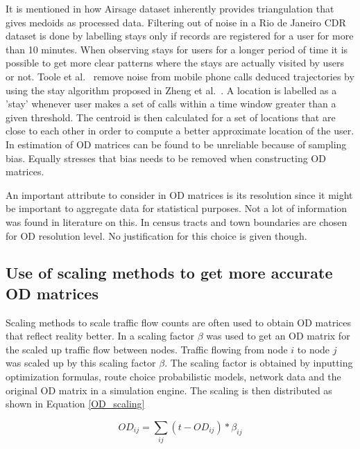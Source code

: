 \documentclass[12pt, a4paper]{report}
\theoremstyle{definition}
\theoremstyle{definition}%
\theoremstyle{definition}%
\theoremstyle{definition}%
\theoremstyle{definition}%
\theoremstyle{definition}%
\begin{document}
It is mentioned in \cite{Colak2015} how Airsage dataset inherently provides triangulation that gives medoids as processed data. Filtering out of noise in a Rio de Janeiro CDR dataset is done by labelling stays only if records are registered for a user for more than 10 minutes. When observing stays for users for a longer period of time it is possible to get more clear patterns where the stays are actually visited by users or not. Toole et al.\ \cite{Toole2015} remove noise from mobile phone calls deduced trajectories by using the stay algorithm proposed in Zheng et al.\ \cite{Zheng2011}. A location is labelled as a 'stay' whenever user makes a set of calls within a time window greater than a given threshold. The centroid is then calculated for a set of locations that are close to each other in order to compute a better approximate location of the user. In \cite{Iqbal2014}  estimation of OD matrices can be found to be unreliable because of sampling bias. Equally \cite{Toole2015} stresses that bias needs to be removed when constructing OD matrices.

An important attribute to consider in OD matrices is its resolution since it might be important to aggregate data for statistical purposes. Not a lot of information was found in literature on this. In \cite{Colak2015} census tracts and town boundaries are chosen for OD resolution level. No justification for this choice is given though.

\subsection{Use of scaling methods to get more accurate OD matrices} \label{subsection:OD_scaling}

Scaling methods to scale traffic flow counts are often used to obtain OD matrices that reflect reality better. In \cite{Iqbal2014} a scaling factor $\beta$ was used to get an OD matrix for the scaled up traffic flow between nodes. Traffic flowing from node $i$ to node $j$ was scaled up by this scaling factor $\beta$. The scaling factor is obtained by inputting optimization formulas, route choice probabilistic models, network data and the original OD matrix in a simulation engine. The scaling is then distributed as shown in Equation \ref{OD_scaling}

\begin{equation}\label{OD_scaling}
\textit{OD}_{ij} = \sum _{ij} (t-OD_{ij}) * \beta_{ij} 
\end{equation}
\end{document}
